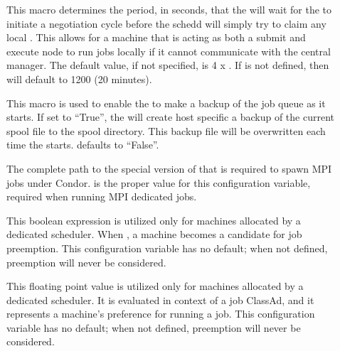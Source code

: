 \begin{description}
\item[]
  \label{param:ScheddAssumeNegotiatorGone} This macro determines the period,
  in seconds, that the  will wait for the  to
  initiate a negotiation cycle before the schedd will simply try to claim
  any local .  This allows for a machine that is acting as
  both a submit and execute node to run jobs locally if it cannot
  communicate with the central manager.  The default value, if not
  specified, is 4 x .  If
   is not defined, then 
   will default to 1200 (20
  minutes).

\item[]
  \label{param:ScheddBackupSpool} This macro is used to enable the
   to make a backup of the job queue as it starts.  If
  set to ``True'', the  will create host specific a
  backup of the current spool file to the spool directory.  This
  backup file will be overwritten each time the 
  starts.   defaults to ``False''.

\item[]
  \label{param:MPICondorRshPath} The complete path to the
  special version of  that is required to spawn MPI
  jobs under Condor.
   is the proper value for this 
  configuration variable, required when running MPI dedicated jobs.

\item[]
  \label{param:ScheddPreemptionRequirements}
  This boolean expression is
  utilized only for machines allocated by a dedicated scheduler.
  When , a machine becomes a candidate for job preemption.
  This configuration variable has no default;
  when not defined, preemption will never be considered.

\item[]
  \label{param:ScheddPreemptionRank}
  This floating point value is
  utilized only for machines allocated by a dedicated scheduler.
  It is evaluated in context of a job ClassAd,
  and it represents a machine's preference for running a job.
  This configuration variable has no default;
  when not defined, preemption will never be considered.
\end{description}

